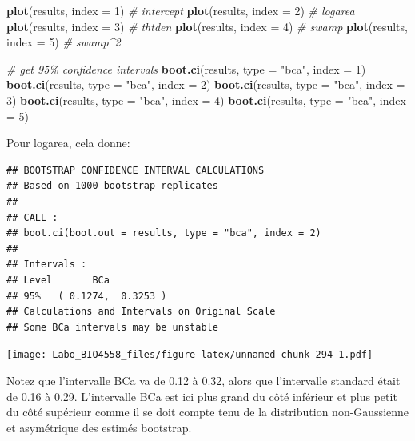 \documentclass[
  12pt,
]{book}
\newenvironment{Shaded}{\begin{snugshade}}{\end{snugshade}}
\newcommand{\CommentTok}[1]{\textcolor[rgb]{0.56,0.35,0.01}{\textit{#1}}}
\newcommand{\DataTypeTok}[1]{\textcolor[rgb]{0.13,0.29,0.53}{#1}}
\newcommand{\DecValTok}[1]{\textcolor[rgb]{0.00,0.00,0.81}{#1}}
\newcommand{\KeywordTok}[1]{\textcolor[rgb]{0.13,0.29,0.53}{\textbf{#1}}}
\newcommand{\NormalTok}[1]{#1}
\newcommand{\StringTok}[1]{\textcolor[rgb]{0.31,0.60,0.02}{#1}}
\begin{document}
\begin{Shaded}
\begin{Highlighting}[]
\KeywordTok{plot}\NormalTok{(results, }\DataTypeTok{index =} \DecValTok{1}\NormalTok{) }\CommentTok{\# intercept}
\KeywordTok{plot}\NormalTok{(results, }\DataTypeTok{index =} \DecValTok{2}\NormalTok{) }\CommentTok{\# logarea}
\KeywordTok{plot}\NormalTok{(results, }\DataTypeTok{index =} \DecValTok{3}\NormalTok{) }\CommentTok{\# thtden}
\KeywordTok{plot}\NormalTok{(results, }\DataTypeTok{index =} \DecValTok{4}\NormalTok{) }\CommentTok{\# swamp}
\KeywordTok{plot}\NormalTok{(results, }\DataTypeTok{index =} \DecValTok{5}\NormalTok{) }\CommentTok{\# swamp\^{}2}

\CommentTok{\# get 95\% confidence intervals}
\KeywordTok{boot.ci}\NormalTok{(results, }\DataTypeTok{type =} \StringTok{"bca"}\NormalTok{, }\DataTypeTok{index =} \DecValTok{1}\NormalTok{)}
\KeywordTok{boot.ci}\NormalTok{(results, }\DataTypeTok{type =} \StringTok{"bca"}\NormalTok{, }\DataTypeTok{index =} \DecValTok{2}\NormalTok{)}
\KeywordTok{boot.ci}\NormalTok{(results, }\DataTypeTok{type =} \StringTok{"bca"}\NormalTok{, }\DataTypeTok{index =} \DecValTok{3}\NormalTok{)}
\KeywordTok{boot.ci}\NormalTok{(results, }\DataTypeTok{type =} \StringTok{"bca"}\NormalTok{, }\DataTypeTok{index =} \DecValTok{4}\NormalTok{)}
\KeywordTok{boot.ci}\NormalTok{(results, }\DataTypeTok{type =} \StringTok{"bca"}\NormalTok{, }\DataTypeTok{index =} \DecValTok{5}\NormalTok{)}
\end{Highlighting}
\end{Shaded}

Pour logarea, cela donne:

\begin{verbatim}
## BOOTSTRAP CONFIDENCE INTERVAL CALCULATIONS
## Based on 1000 bootstrap replicates
## 
## CALL : 
## boot.ci(boot.out = results, type = "bca", index = 2)
## 
## Intervals : 
## Level       BCa          
## 95%   ( 0.1274,  0.3253 )  
## Calculations and Intervals on Original Scale
## Some BCa intervals may be unstable
\end{verbatim}

\texttt{[image: Labo\_BIO4558\_files/figure-latex/unnamed-chunk-294-1.pdf]}

Notez que l'intervalle BCa va de 0.12 à 0.32, alors que l'intervalle standard était de 0.16 à 0.29. L'intervalle BCa est ici plus grand du côté inférieur et plus petit du côté supérieur comme il se doit compte tenu de la distribution non-Gaussienne et asymétrique des estimés bootstrap.
\end{document}
